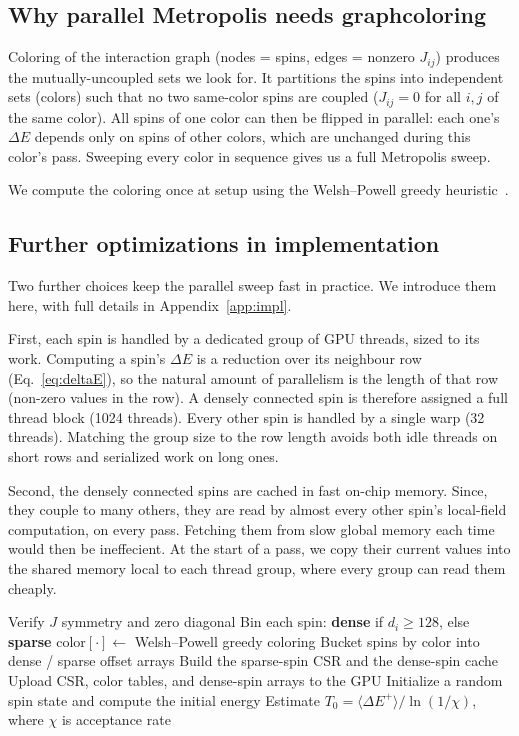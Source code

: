 \documentclass[reprint,twocolumn,amsmath,amssymb,nofootinbib]{revtex4-2}
\newcommand{\dE}{\Delta E}
\begin{document}
\subsection{Why parallel Metropolis needs graphcoloring}\label{sec:sa-coloring}

Coloring of the interaction graph (nodes = spins, edges = nonzero $J_{ij}$) produces the mutually-uncoupled sets we look for. It partitions the spins into independent sets (colors) such that no two same-color spins are coupled ($J_{ij} = 0$ for all $i,j$ of the same color). All spins of one color can then be flipped in parallel: each one's $\dE$ depends only on spins of other colors, which are unchanged during this color's pass. Sweeping every color in sequence gives us a full Metropolis sweep.

We compute the coloring once at setup using the Welsh--Powell greedy heuristic~\cite{WelshPowell1967}.

\subsection{Further optimizations in implementation}\label{sec:sa-impl}

Two further choices keep the parallel sweep fast in practice. We introduce them here, with full details in Appendix~\ref{app:impl}.

First, each spin is handled by a dedicated group of GPU threads, sized to its work. Computing a spin's $\dE$ is a reduction over its neighbour row (Eq.~\eqref{eq:deltaE}), so the natural amount of parallelism is the length of that row (non-zero values in the row). A densely connected spin is therefore assigned a full thread block (1024 threads). Every other spin is handled by a single warp (32 threads). Matching the group size to the row length avoids both idle threads on short rows and serialized work on long ones.

Second, the densely connected spins are cached in fast on-chip memory. Since, they couple to many others, they are read by almost every other spin's local-field computation, on every pass. Fetching them from slow global memory each time would then be ineffecient. At the start of a pass, we copy their current values into the shared memory local to each thread group, where every group can read them cheaply.

\begin{algorithm}[!htbp]
  \caption{One-time setup before annealing}
  \label{alg:setup}
  Verify $J$ symmetry and zero diagonal\;
  Bin each spin: \textbf{dense} if $d_i \geq 128$, else \textbf{sparse}\;
  $\mathrm{color}[\cdot] \leftarrow$ Welsh--Powell greedy
    coloring\;
  Bucket spins by color into dense / sparse offset arrays\;
  Build the sparse-spin CSR and the dense-spin cache\;
  Upload CSR, color tables, and dense-spin arrays to the GPU\;
  Initialize a random spin state and compute the initial energy\;
  Estimate $T_0 = \langle \dE^{+} \rangle / \ln(1/\chi)$, where $\chi$ is acceptance rate\;
\end{algorithm}
\end{document}
